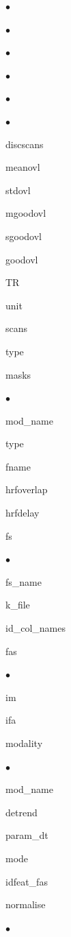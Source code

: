 \begin{list}{$\bullet$}
\begin{list}{$\bullet$}
\begin{list}{$\bullet$}
\begin{list}{$\bullet$}
\begin{list}{$\bullet$}
\begin{list}{$\bullet$}
\item discscans
\item meanovl
\item stdovl
\item mgoodovl
\item sgoodovl
\item goodovl
\end{list}
\item TR
\item unit
\end{list}
\item scans
\item type
\end{list}
\end{list}
\end{list}
\item masks
\begin{list}{$\bullet$}
	{\setlength{\labelsep}{.2cm}\setlength{\itemindent}{0cm}\setlength{\leftmargin}{0.7cm}}
\item mod\_name
\item type
\item fname
\item hrfoverlap
\item hrfdelay
\end{list}
\item fs
\begin{list}{$\bullet$}
	{\setlength{\labelsep}{.2cm}\setlength{\itemindent}{0cm}\setlength{\leftmargin}{0.7cm}}
\item fs\_name
\item k\_file
\item id\_col\_names
\item fas
\begin{list}{$\bullet$}
	{\setlength{\labelsep}{.2cm}\setlength{\itemindent}{0cm}\setlength{\leftmargin}{1.2cm}}
\item im
\item ifa
\end{list}
\item modality
\begin{list}{$\bullet$}
	{\setlength{\labelsep}{.2cm}\setlength{\itemindent}{0cm}\setlength{\leftmargin}{1.2cm}}
\item mod\_name
\item detrend
\item param\_dt
\item mode
\item idfeat\_fas
\item normalise
\begin{list}{$\bullet$}

\end{list}
\end{list}
\end{list}
\end{list}
